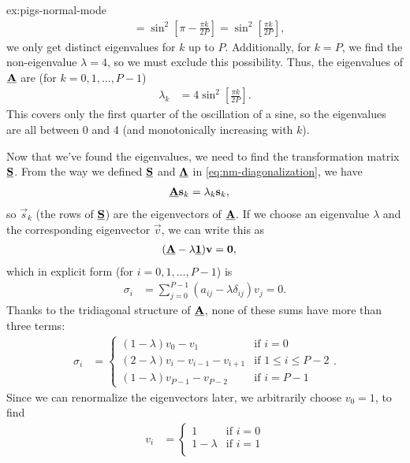 \begin{DefAnswer}{ex:pigs-normal-mode}
\begin{align}
		&= \sin^2{\left[ \pi - \frac{\pi k}{2 P} \right]}
		= \sin^2{\left[ \frac{\pi k}{2 P} \right]},
	\end{align}
	we only get distinct eigenvalues for $k$ up to $P$.
	Additionally, for $k = P$, we find the non-eigenvalue $\lambda = 4$, so we must exclude this possibility.
	Thus, the eigenvalues of $\underline{\bm{\mathbf{A}}}$ are (for $k = 0, 1, \ldots, P - 1$)
	\begin{align}
		\lambda_k
		&= 4 \sin^2{\left[ \frac{\pi k}{2 P} \right]}.
	\end{align}
	This covers only the first quarter of the oscillation of a sine, so the eigenvalues are all between 0 and 4 (and monotonically increasing with $k$).

	Now that we've found the eigenvalues, we need to find the transformation matrix $\underline{\bm{\mathbf{S}}}$.
	From the way we defined $\underline{\bm{\mathbf{S}}}$ and $\underline{\bm{\mathbf{\Lambda}}}$ in \cref{eq:nm-diagonalization}, we have
	\begin{align}
		\underline{\bm{\mathbf{A}}} \bm{\mathbf{s}}_k
		&= \lambda_k \bm{\mathbf{s}}_k,
	\end{align}
	so $\vec{s}_k$ (the rows of $\underline{\bm{\mathbf{S}}}$) are the eigenvectors of $\underline{\bm{\mathbf{A}}}$.
	If we choose an eigenvalue $\lambda$ and the corresponding eigenvector $\vec{v}$, we can write this as
	\begin{align}
		(\underline{\bm{\mathbf{A}}} - \lambda \underline{\bm{\mathbf{1}}}) \bm{\mathbf{v}}
		&= \bm{\mathbf{0}},
	\end{align}
	which in explicit form (for $i = 0, 1, \ldots, P - 1$) is
	\begin{align}
		\sigma_i
		&= \sum_{j=0}^{P-1} (a_{ij} - \lambda \delta_{ij}) v_j
		= 0.
	\end{align}
	Thanks to the tridiagonal structure of $\underline{\bm{\mathbf{A}}}$, none of these sums have more than three terms:
	\begin{align}
		\sigma_i
		&= \begin{cases}
				(1 - \lambda) v_0 - v_1 & \text{if } i = 0 \\
				(2 - \lambda) v_i - v_{i-1} - v_{i+1} & \text{if } 1 \le i \le P - 2 \\
				(1 - \lambda) v_{P-1} - v_{P-2} & \text{if } i = P - 1
			\end{cases}.
	\end{align}
	Since we can renormalize the eigenvectors later, we arbitrarily choose $v_0 = 1$, to find
	\begin{align}
		v_i
		&= \begin{cases}
				1 & \text{if } i = 0 \\
				1 - \lambda & \text{if } i = 1 \\

\end{cases}
\end{align}
\end{DefAnswer}
